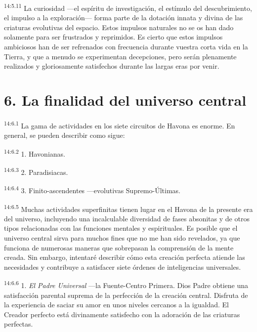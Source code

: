 \par
\textsuperscript{14:5.11} La curiosidad ---el espíritu de investigación, el estímulo del descubrimiento, el impulso a la exploración--- forma parte de la dotación innata y divina de las criaturas evolutivas del espacio. Estos impulsos naturales no se os han dado solamente para ser frustrados y reprimidos. Es cierto que estos impulsos ambiciosos han de ser refrenados con frecuencia durante vuestra corta vida en la Tierra, y que a menudo se experimentan decepciones, pero serán plenamente realizados y gloriosamente satisfechos durante las largas eras por venir.

\section*{6. La finalidad del universo central}
\par
\textsuperscript{14:6.1} La gama de actividades en los siete circuitos de Havona es enorme. En general, se pueden describir como sigue:

\par
\textsuperscript{14:6.2} 1. Havonianas.

\par
\textsuperscript{14:6.3} 2. Paradisiacas.

\par
\textsuperscript{14:6.4} 3. Finito-ascendentes ---evolutivas Supremo-Últimas.

\par
\textsuperscript{14:6.5} Muchas actividades superfinitas tienen lugar en el Havona de la presente era del universo, incluyendo una incalculable diversidad de fases absonitas y de otros tipos relacionadas con las funciones mentales y espirituales. Es posible que el universo central sirva para muchos fines que no me han sido revelados, ya que funciona de numerosas maneras que sobrepasan la comprensión de la mente creada. Sin embargo, intentaré describir cómo esta creación perfecta atiende las necesidades y contribuye a satisfacer siete órdenes de inteligencias universales.

\par
\textsuperscript{14:6.6} 1. \textit{El Padre Universal} ---la Fuente-Centro Primera. Dios Padre obtiene una satisfacción parental suprema de la perfección de la creación central. Disfruta de la experiencia de saciar su amor en unos niveles cercanos a la igualdad. El Creador perfecto está divinamente satisfecho con la adoración de las criaturas perfectas.

